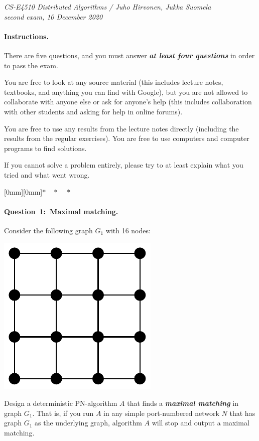\documentclass[12pt,a4paper]{article}
\newcommand{\q}[2]{\paragraph{\mbox{Question #1: }#2.}}
\newcommand{\sep}{{\centering \raisebox{-3mm}[0mm][0mm]{$*\quad*\quad*$}\par}}
\newcommand{\hl}[1]{\textbf{\emph{#1}}}
\begin{document}
\noindent
\emph{CS-E4510 Distributed Algorithms / Juho Hirvonen, Jukka Suomela\\
second exam, 10 December 2020}

\paragraph{Instructions.}

There are five questions, and you must answer \hl{at least four questions} in order to pass the exam.

You are free to look at any source material (this includes lecture notes, textbooks, and anything you can find with Google), but you are not allowed to collaborate with anyone else or ask for anyone's help (this includes collaboration with other students and asking for help in online forums).

You are free to use any results from the lecture notes directly (including the results from the regular exercises). You are free to use computers and computer programs to find solutions.

If you cannot solve a problem entirely, please try to at least explain what you tried and what went wrong.

\sep

\q{1}{Maximal matching}

Consider the following graph $G_1$ with 16 nodes:
\begin{center}
\includegraphics[page=1,scale=0.5]{figs.pdf}
\end{center}
Design a deterministic PN-algorithm $A$ that finds a \hl{maximal matching} in graph $G_1$. That is, if you run $A$ in any simple port-numbered network $N$ that has graph $G_1$ as the underlying graph, algorithm $A$ will stop and output a maximal matching.
\end{document}
